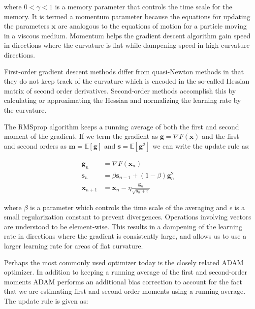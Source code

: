 where $0 < \gamma < 1$ is a memory parameter
that controls the time scale for the memory.
It is termed a momentum parameter because the equations
for updating the parameters $\bm{x}$ are analogous to
the equations of motion for a particle moving
in a viscous medium. Momentum helps the gradient descent
algorithm gain speed in directions where the curvature
is flat while dampening speed in high curvature directions.
\par
First-order gradient descent methods differ from quasi-Newton methods
in that they do not keep track of the curvature which is encoded
in the so-called Hessian matrix of second order derivatives.
Second-order methods accomplish this by calculating or approximating
the Hessian and normalizing the learning rate by the curvature.
\par
The RMSprop algorithm keeps a running average of both the
first and second moment of the gradient. If we term
the gradient as $\bm{g} = \nabla F(\bm{x})$
and the first and second orders as
$\bm{m} = \mathbb{E}[\bm{g}]$ and $\bm{s} = \mathbb{E}[\bm{g}^2]$
we can write the update rule as:

\begin{equation}
    \begin{split}
        \bm{g}_n &= \nabla F(\bm{x}_n) \\
        \bm{s}_n &= \beta \bm{s}_{n-1} + (1 - \beta)\bm{g}_{n}^2 \\
        \bm{x}_{n+1} &= \bm{x}_n - \eta \frac{\bm{g}_n}
        {\sqrt{\bm{s}_n + \epsilon}}
    \end{split}
\end{equation}

where $\beta$ is a parameter which controls the time scale
of the averaging and $\epsilon$ is a small regularization constant
to prevent divergences. Operations involving vectors are understood
to be element-wise. This results in a dampening of the learning rate
in directions where the gradient is consistently large,
and allows us to use a larger learning rate for areas
of flat curvature.
\par
Perhaps the most commonly used optimizer today is the closely
related ADAM optimizer. In addition to keeping a running average
of the first and second-order moments ADAM performs
an additional bias correction to account for the 
fact that we are estimating first and second order moments
using a running average. The update rule is given as:

